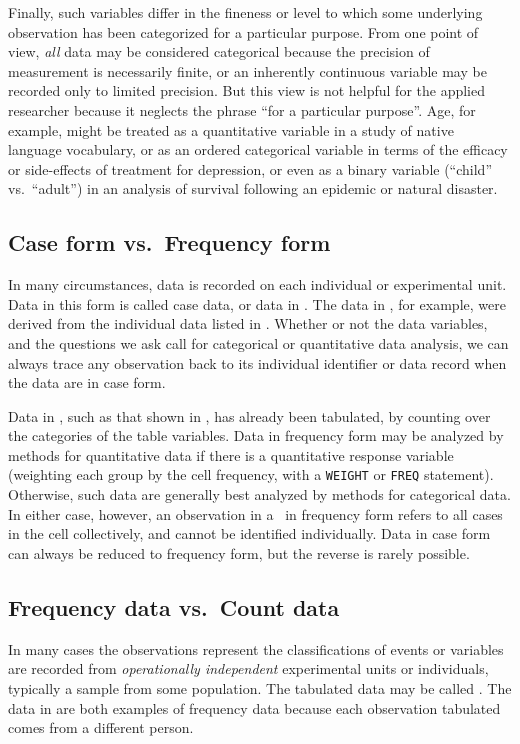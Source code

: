 Finally, such variables differ in the
fineness or level to which some underlying observation has been
categorized for a particular purpose.
From one point of view, \emph{all} data
may be considered categorical because the precision of measurement
is necessarily finite, or an inherently continuous variable may be recorded only to limited precision.   But this view is not helpful for the applied
researcher because it neglects the phrase ``for a particular purpose''.
Age, for example, might be treated as a quantitative variable in a study of
native language vocabulary, or as an ordered categorical variable in terms of
the efficacy or side-effects of treatment for depression, or even as a
binary variable (``child'' vs.\  ``adult'') in an analysis of survival following
an epidemic or natural disaster.


\subsection{Case form vs.\ Frequency form}
In many circumstances, data is recorded on each individual or experimental
unit.  Data in this form is called case data,
or data in .
The data in , for example, were derived from
the individual data listed in .
Whether
or not the data variables, and the questions we ask call for
categorical or quantitative data analysis, we can always trace
any observation back to its individual identifier or data record
when the data are in case form.

Data in , such as that shown in ,
has already been tabulated, by counting over the categories of the
table variables.  Data in frequency form may be analyzed by methods
for quantitative data if there is a quantitative response variable
(weighting each group by the cell frequency, with a \texttt{WEIGHT}
or \texttt{FREQ} statement).  Otherwise, such data are generally
best analyzed by methods for categorical data.
In either case, however, an observation in a \Dset\ in
frequency form refers
to all cases in the cell collectively, and cannot be identified individually.
Data in case form can always be reduced to frequency form,
but the reverse is rarely possible.

\subsection{Frequency data vs.\ Count data}
In many cases the observations represent the classifications of events or variables are 
recorded from \emph{operationally independent} experimental units or individuals, typically
a sample from some population.  The tabulated data may be called
.  The data in 
are both examples of frequency data because each observation tabulated
comes from a different person.

